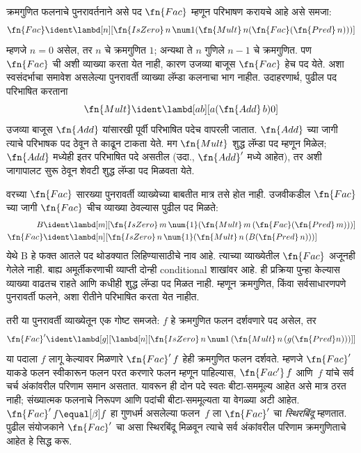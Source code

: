 \documentclass[../../../include/open-logic-section]{subfiles}
\begin{document}


क्रमगुणित फलनाचे पुनरावर्तनाने असे पद $\fn{Fac}$
म्हणून परिभाषण करायचे आहे असे समजा:
\[
\fn{Fac} \ident \lambd[n][\fn{IsZero}\, n\, \num 1 (\fn{Mult}\, n (\fn{Fac}(\fn{Pred} \, n)))]
\]
म्हणजे $n = 0$ असेल, तर $n$ चे क्रमगुणित $1$;
अन्यथा ते $n$ गुणिले $n-1$ चे क्रमगुणित.
पण $\fn{Fac}$ ची अशी व्याख्या करता येत नाही,
कारण उजव्या बाजूस $\fn{Fac}$ हेच पद येते.
अशा स्वसंदर्भाचा समावेश असलेल्या पुनरावर्ती
व्याख्या लॅम्डा कलनाचा भाग नाहीत. उदाहरणार्थ,
पुढील पद परिभाषित करताना
\[
\fn{Mult} \ident \lambd[ab][a (\fn{Add}\, b) 0]
\]
उजव्या बाजूस $\fn{Add}$ यांसारखी पूर्वी परिभाषित
पदेच वापरली जातात. $\fn{Add}$ च्या जागी त्याचे
परिभाषक पद ठेवून ते काढून टाकता येते. मग
$\fn{Mult}$ शुद्ध लॅम्डा पद म्हणून मिळेल;
$\fn{Add}$ मध्येही इतर परिभाषित पदे असतील
(उदा., $\fn{Add}'$ मध्ये आहेत), तर अशी जागापालट
सुरू ठेवून शेवटी शुद्ध लॅम्डा पद मिळवता येते.

वरच्या $\fn{Fac}$ सारख्या पुनरावर्ती व्याख्येच्या
बाबतीत मात्र तसे होत नाही. उजवीकडील $\fn{Fac}$
च्या जागी $\fn{Fac}$ चीच व्याख्या ठेवल्यास पुढील पद मिळते:
\begin{align*}
  B &\ident \lambd[m][\fn{IsZero}\,m\,\num{1}
       (\fn{Mult}\,m\,(\fn{Fac}(\fn{Pred}\,m)))]\\
  \fn{Fac} &\ident \lambd[n][\fn{IsZero}\,n\,\num{1}
       (\fn{Mult}\,n\,(B(\fn{Pred}\,n)))]
\end{align*}
येथे B हे फक्त आतले पद थोडक्यात लिहिण्यासाठीचे नाव आहे.
त्याच्या व्याख्येतील $\fn{Fac}$ अजूनही गेलेले नाही.
बाह्य अमूर्तीकरणाची व्याप्ती दोन्ही conditional शाखांवर आहे.
ही प्रक्रिया पुन्हा केल्यास व्याख्या वाढतच राहते
आणि कधीही शुद्ध लॅम्डा पद मिळत नाही. म्हणून
क्रमगुणित, किंवा सर्वसाधारणपणे पुनरावर्ती फलने,
अशा रीतीने परिभाषित करता येत नाहीत.

तरी या पुनरावर्ती व्याख्येतून एक गोष्ट समजते:
$f$ हे क्रमगुणित फलन दर्शवणारे पद असेल, तर
\[
\fn{Fac}' \ident \lambd[g][\lambd[n][\fn{IsZero} \, n \, \num 1\, (\fn{Mult} \, n\, (g (\fn{Pred} n)))]]
\]
या पदाला $f$ लागू केल्यावर मिळणारे
$\fn{Fac}'\,f$ हेही क्रमगुणित फलन दर्शवते.
म्हणजे $\fn{Fac}'$ याकडे फलन स्वीकारून फलन
परत करणारे फलन म्हणून पाहिल्यास, $\fn{Fac'}\, f$
आणि~$f$ यांचे सर्व चर्च अंकांवरील परिणाम समान असतात.
यावरून ही दोन पदे स्वतः बीटा-सममूल्य आहेत असे मात्र
ठरत नाही; संख्यात्मक फलनाचे निरूपण आणि पदांची
बीटा-सममूल्यता या वेगळ्या अटी आहेत. $\fn{Fac}' \, f \equal[\beta] f$
हा गुणधर्म असलेल्या फलन~$f$ ला $\fn{Fac}'$
चा \emph{स्थिरबिंदू} म्हणतात. पुढील संयोजकाने
$\fn{Fac}'$ चा असा स्थिरबिंदू मिळवून त्याचे सर्व
अंकांवरील परिणाम क्रमगुणिताचे आहेत हे सिद्ध करू.
\end{document}
